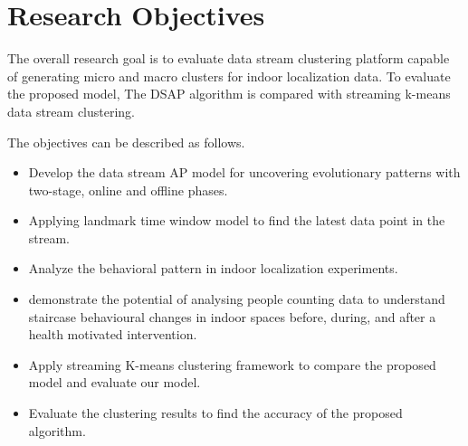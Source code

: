 \section{Research Objectives}

The overall research goal is to evaluate data stream clustering platform capable of generating micro and macro clusters for indoor localization data. To evaluate the proposed model, The DSAP algorithm is compared with streaming k-means data stream clustering.

The objectives can be described as follows. 

\begin{itemize}
    \item Develop the data stream AP model for uncovering evolutionary patterns with two-stage, online and offline phases.
     \item Applying landmark time window model to find the latest data point in the stream.
   
    \item Analyze the behavioral pattern in indoor localization experiments.
    \item demonstrate the potential of analysing people counting data to understand staircase behavioural changes in indoor spaces before, during, and after a health motivated intervention.
    \item Apply streaming K-means clustering framework to compare the proposed model and evaluate our model.
    \item Evaluate the clustering results to find the accuracy of the proposed algorithm.




\end{itemize}
 



